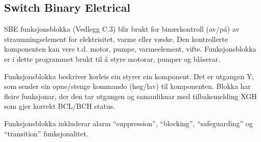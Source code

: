\newpage

\subsection{Switch Binary Eletrical} 

\gls{SBE} funksjonsblokka (Vedlegg C.3) blir brukt for binærkontroll (av/på) av straumningselement for elektrisitet, varme eller væske. 
Den kontrollerte komponenten kan vere t.d. motor, pumpe, varmeelement, vifte.
Funksjonsblokka er i dette programmet brukt til å styre motorar, pumper og blåserar.

Funksjonsblokka beskriver korleis ein styrer ein komponent.
Det er utgangen Y, som sender ein opne/stenge kommando (høg/lav) til komponenten. Blokka har fleire funksjonar, der den
tar utgangen og samanliknar med tilbakemelding \gls{XGH} som gjer korrekt \gls{BCL}/\gls{BCH} status. 

Funksjonsblokka inkluderar alarm ``suppression'', ``blocking'', ``safeguarding'' og ``transition'' funksjonalitet.

